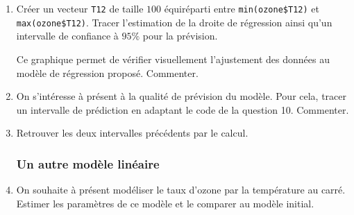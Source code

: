 \documentclass{../../TD/td_um}
\providecommand{\1}{\mathds{1}}
\begin{document}
\begin{enumerate}
		\item Créer un vecteur \texttt{T12} de taille $100$ équiréparti entre \texttt{min(ozone\$T12)} et \texttt{max(ozone\$T12)}. Tracer l'estimation de la droite de régression ainsi qu'un intervalle de confiance à $95 \%$ pour la prévision.
		
		Ce graphique permet de vérifier visuellement l'ajustement des données au modèle de régression proposé. Commenter.
		\item On s'intéresse à présent à la qualité de prévision du modèle. Pour cela, tracer un intervalle de prédiction en adaptant le code de la question 10. Commenter.
		
		\item Retrouver les deux intervalles précédents par le calcul.
	
	\subsubsection*{Un autre modèle linéaire}
		\item On souhaite à présent modéliser le taux d'ozone par la température au carré. Estimer les paramètres de ce modèle et le comparer au modèle initial.
	\end{enumerate}
	
	
\end{document}
